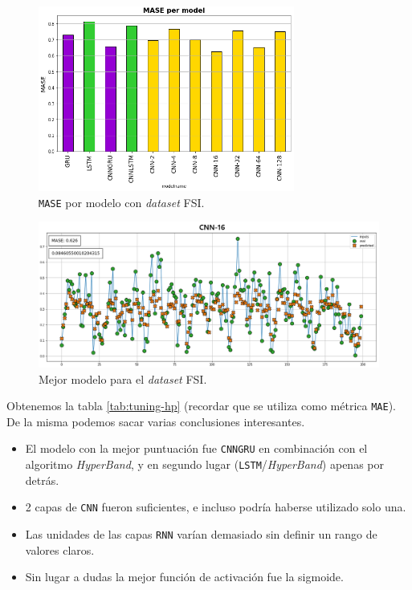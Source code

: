 \documentclass[a4paper,12pt]{article}
\begin{document}
\begin{figure}[H]
	\begin{center}
	\includegraphics[width=0.75\textwidth]{mase_per_model_fsi.png}
  	\caption{\texttt{MASE} por modelo con \textit{dataset} FSI.}
  	\label{fig:mase_per_model_fsi}
  	\end{center}
\end{figure}

\begin{figure}[H]
	\begin{center}
	\includegraphics[width=1\textwidth]{best_model_fsi.png}
  	\caption{Mejor modelo para el \textit{dataset} FSI.}
  	\label{fig:best_model_fsi}
  	\end{center}
\end{figure}

Obtenemos la tabla \ref{tab:tuning-hp} (recordar que se utiliza como métrica \texttt{MAE}). De la misma podemos sacar varias conclusiones interesantes.
\begin{itemize}[noitemsep, topsep=2pt]
	\item El modelo con la mejor puntuación fue \texttt{CNNGRU} en combinación con el algoritmo \textit{HyperBand}, y en segundo lugar (\texttt{LSTM}/\textit{HyperBand}) apenas por detrás.
	\item 2 capas de \texttt{CNN} fueron suficientes, e incluso podría haberse utilizado solo una.
	\item Las unidades de las capas \texttt{RNN} varían demasiado sin definir un rango de valores claros.
	\item Sin lugar a dudas la mejor función de activación fue la sigmoide.
\end{itemize}
\end{document}
